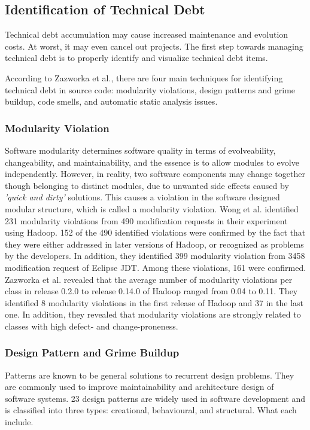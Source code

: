 \subsection{Identification of Technical Debt}
Technical debt accumulation may cause increased maintenance and evolution costs. At worst, it may even cancel out projects. The first step towards managing technical debt is to properly identify and visualize  technical debt items. 

According to Zazworka et al.\cite{zazworka2014comparing}, there are four main techniques for identifying technical debt in source code: modularity violations, design patterns and grime buildup, code smells, and automatic static analysis issues. 

\subsubsection{Modularity Violation}
Software modularity determines software quality in terms of evolveability, changeability, and maintainability\cite{huynh2007evolutionary}, and the essence is to allow modules to evolve independently. However, in reality, two software components may change together though belonging to distinct modules, due to unwanted side effects caused by \textit{'quick and dirty'} solutions\cite{wong2011detecting,zazworka2014comparing}. This causes a violation in the software designed modular structure, which is called a modularity violation. Wong et al.\cite{wong2011detecting} identified 231 modularity violations from 490 modification requests in their experiment using Hadoop. 152 of the 490 identified violations were confirmed by the fact that they were either addressed in later versions of Hadoop, or recognized as problems by the developers. In addition, they identified 399 modularity violation from 3458 modification request of Eclipse JDT\cite{wong2011detecting}. Among these violations, 161 were confirmed. Zazworka et al.\cite{zazworka2014comparing} revealed that the average number of modularity violations per class in release 0.2.0 to release 0.14.0 of Hadoop ranged from 0.04 to 0.11. They identified 8 modularity violations in the first release of Hadoop and 37 in the last one. In addition, they revealed that modularity violations are strongly related to classes with high defect- and change-proneness. 



\subsubsection{Design Pattern and Grime Buildup}
Patterns are known to be general solutions to recurrent design problems. They are commonly used to improve maintainability and architecture design of software systems. 23 design patterns are widely used in software development and is classified into three types: creational, behavioural, and structural. What each include.

